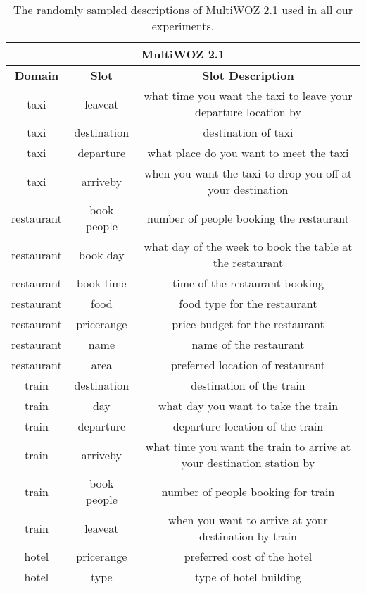 \documentclass[11pt]{article}
\begin{document}
\begin{table*}[t]
    \small
    \centering
    \caption{The randomly sampled descriptions of MultiWOZ 2.1 used in all our experiments.}
    \label{tab:2.1DESC}
    \begin{tabular}{ccc}
    \toprule
        \multicolumn{3}{c}{MultiWOZ 2.1}\\
        \midrule
         \textbf{Domain}   & \textbf{Slot} & \textbf{Slot Description} \\
         taxi & leaveat & what time you want the taxi to leave your departure location by\\
         taxi & destination & destination of taxi\\
         taxi  & departure & what place do you want to meet the taxi\\
         taxi   & arriveby & when you want the taxi to drop you off at your destination\\
         restaurant  & book people & number of people booking the restaurant\\
         restaurant  & book day &  what day of the week to book the table at the restaurant\\
        restaurant  & book time & time of the restaurant booking\\
        restaurant  & food & food type for the restaurant\\
        restaurant  & pricerange &  price budget for the restaurant\\
        restaurant  & name & name of the restaurant\\
          restaurant  & area & preferred location of restaurant\\
          train & destination & destination of the train\\
          train  & day &  what day you want to take the train\\
        train  & departure &  departure location of the train\\
        train  & arriveby & what time you want the train to arrive at your destination station by\\
        train  & book people  &  number of people booking for train\\
        train  & leaveat &  when you want to arrive at your destination by train\\
        hotel  & pricerange  & preferred cost of the hotel\\
        hotel  & type &   type of hotel building\\

\end{tabular}
\end{table*}
\end{document}

